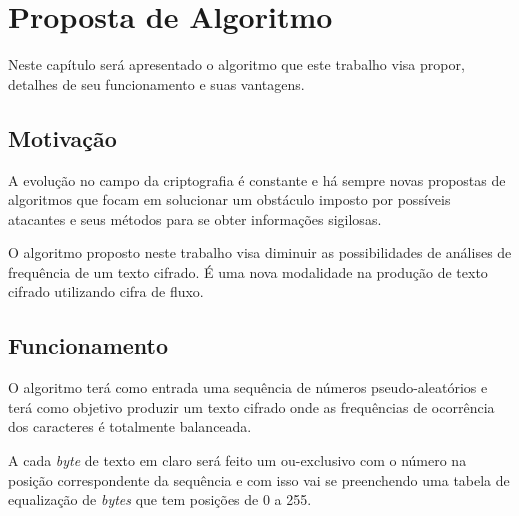 \chapter{Proposta de Algoritmo}
\label{algorithm-proposition}

Neste capítulo será apresentado o algoritmo que este trabalho visa propor, detalhes de seu funcionamento e suas vantagens.

\section{Motivação}
\label{motivation}

A evolução no campo da criptografia é constante e há sempre novas propostas de algoritmos que focam em solucionar um obstáculo imposto por possíveis atacantes e seus métodos para se obter informações sigilosas.

O algoritmo proposto neste trabalho visa diminuir as possibilidades de análises de frequência de um texto cifrado. É uma nova modalidade na produção de texto cifrado utilizando cifra de fluxo. 


\section{Funcionamento}
\label{functioning}

O algoritmo terá como entrada uma sequência de números pseudo-aleatórios e terá como objetivo produzir um texto cifrado onde as frequências de ocorrência dos caracteres é totalmente balanceada.

A cada \textit{byte} de texto em claro será feito um ou-exclusivo com o número na posição correspondente da sequência e com isso vai se preenchendo uma tabela de equalização de \textit{bytes} que tem posições de 0 a 255.

